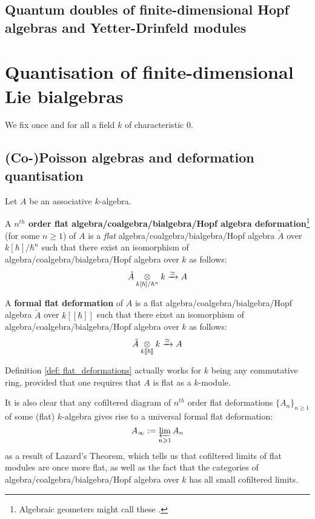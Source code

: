     \subsection{Quantum doubles of finite-dimensional Hopf algebras and Yetter-Drinfeld modules}
    
\section{Quantisation of finite-dimensional Lie bialgebras}
    \begin{convention}
        We fix once and for all a field $k$ of characteristic $0$. 
    \end{convention}
    
    \subsection{(Co-)Poisson algebras and deformation quantisation}
        \begin{definition} \label{def: flat_deformations}
            Let $A$ be an associative $k$-algebra.
            
            A \textbf{$n^{th}$ order flat algebra/coalgebra/bialgebra/Hopf algebra deformation}\footnote{Algebraic geometers might call these .} (for some $n \geq 1$) of $A$ is a \textit{flat} algebra/coalgebra/bialgebra/Hopf algebra $\tilde{A}$ over $k[\hbar]/\hbar^n$ such that there exist an isomorphism of algebra/coalgebra/bialgebra/Hopf algebra over $k$ as follows:
                $$\tilde{A} \tensor_{k[\hbar]/\hbar^n} k \xrightarrow[]{\cong} A$$
                
            A \textbf{formal flat deformation} of $A$ is a flat algebra/coalgebra/bialgebra/Hopf algebra $\tilde{A}$ over $k[\![\hbar]\!]$ such that there eixst an isomorphism of algebra/coalgebra/bialgebra/Hopf algebra over $k$ as follows:
                $$\tilde{A} \tensor_{k[\![\hbar]\!]} k \xrightarrow[]{\cong} A$$
        \end{definition}
        \begin{remark}
            Definition \ref{def: flat_deformations} actually works for $k$ being any commutative ring, provided that one requires that $A$ is flat as a $k$-module. 
            
            It is also clear that any cofiltered diagram of $n^{th}$ order flat deformations $\{A_n\}_{n \geq 1}$ of some (flat) $k$-algebra gives rise to a universal formal flat deformation:
                $$A_{\infty} := \projlim_{n \geq 1} A_n$$
            as a result of Lazard's Theorem, which tells us that cofiltered limits of flat modules are once more flat, as well as the fact that the categories of algebra/coalgebra/bialgebra/Hopf algebra over $k$ has all small cofiltered limits. 
        \end{remark}
